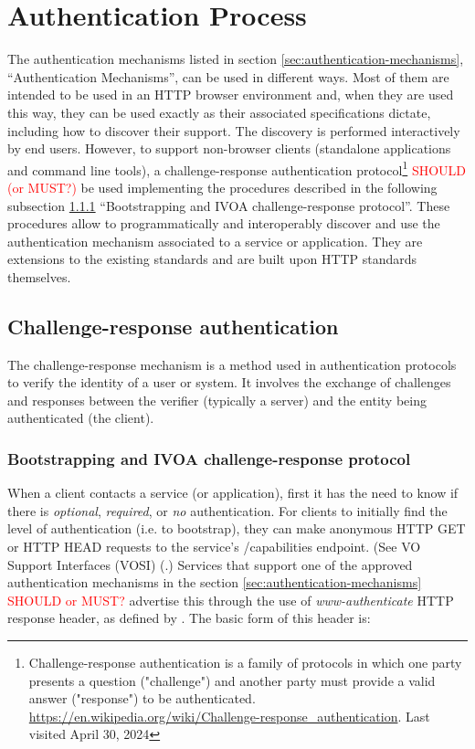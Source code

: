 \documentclass[11pt,a4paper]{ivoa}
\begin{document}
\section{Authentication Process}
\label{sec:auth_discovery}

The authentication mechanisms listed in section
\ref{sec:authentication-mechanisms}, ``Authentication Mechanisms'', 
can be used in different ways. Most of them are intended to
be used in an HTTP browser environment and, when they are used this 
way, they can be used exactly as their associated specifications 
dictate, including how to discover their support. The discovery is 
performed interactively by end users.  
However, to support non-browser clients
(standalone applications and command line tools), a challenge-response 
authentication protocol\footnote{Challenge-response authentication is 
a family of protocols in which one party presents a question 
("challenge") and another party must provide a valid answer 
("response") to be authenticated. 
\url{https://en.wikipedia.org/wiki/Challenge-response_authentication}. 
Last visited April 30, 2024} \textcolor{red}{SHOULD 
(or MUST?)} be used implementing the procedures described in
the following subsection \ref{sec:bootstrapping-challenge} 
``Bootstrapping and IVOA challenge-response protocol''. These procedures 
allow to programmatically and interoperably discover and use the
authentication mechanism associated to a service or application. They 
are extensions to the existing standards and are built upon HTTP 
standards themselves.

\subsection{Challenge-response authentication}
\label{challenge-response-auth}
The challenge-response mechanism is a method used in authentication 
protocols to verify the identity of a user or system. It involves the 
exchange of challenges and responses between the verifier (typically a 
server) and the entity being authenticated (the client).

\subsubsection{Bootstrapping and IVOA challenge-response protocol}
\label{sec:bootstrapping-challenge}
When a client contacts a service (or application), first it has the need
to know if there is \emph{optional}, \emph{required}, or \emph{no} 
authentication.
For clients to initially find the level of authentication (i.e. to
bootstrap), they can make anonymous HTTP GET or HTTP HEAD requests to
the service's /capabilities endpoint. (See VO Support Interfaces (VOSI)
(\citep{2017ivoa.spec.0524G}.)
Services that support one of the approved authentication mechanisms in the section 
\ref{sec:authentication-mechanisms} \textcolor{red}{SHOULD or MUST?}
advertise this through the use of \emph{www-authenticate} HTTP response
header, as defined by \citep{std:RFC7235}. The basic form of this
header is:
\end{document}
